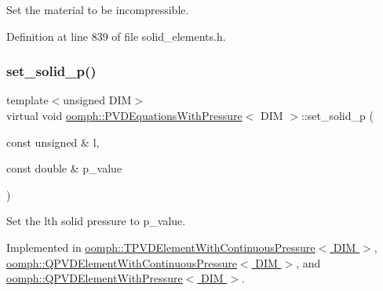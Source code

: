 Set the material to be incompressible. 



Definition at line 839 of file solid\+\_\+elements.\+h.

\mbox{\label{classoomph_1_1PVDEquationsWithPressure_a35b462a689e05929fa15a9abd2b920f0}} 
\subsubsection{\texorpdfstring{set\+\_\+solid\+\_\+p()}{set\_solid\_p()}}
{\footnotesize\ttfamily template$<$unsigned D\+IM$>$ \\
virtual void \hyperlink{classoomph_1_1PVDEquationsWithPressure}{oomph\+::\+P\+V\+D\+Equations\+With\+Pressure}$<$ D\+IM $>$\+::set\+\_\+solid\+\_\+p (\begin{DoxyParamCaption}\item[{const unsigned \&}]{l,  }\item[{const double \&}]{p\+\_\+value }\end{DoxyParamCaption})\hspace{0.3cm}{\ttfamily [pure virtual]}}



Set the lth solid pressure to p\+\_\+value. 



Implemented in \hyperlink{classoomph_1_1TPVDElementWithContinuousPressure_a3dd6618975cc1eb47cb4a4da4c3f9274}{oomph\+::\+T\+P\+V\+D\+Element\+With\+Continuous\+Pressure$<$ D\+I\+M $>$}, \hyperlink{classoomph_1_1QPVDElementWithContinuousPressure_a796553fe8e806158167c598e4c85596f}{oomph\+::\+Q\+P\+V\+D\+Element\+With\+Continuous\+Pressure$<$ D\+I\+M $>$}, and \hyperlink{classoomph_1_1QPVDElementWithPressure_a50241b9156808fb68182405335438769}{oomph\+::\+Q\+P\+V\+D\+Element\+With\+Pressure$<$ D\+I\+M $>$}.

\mbox{\label{classoomph_1_1PVDEquationsWithPressure_a2f447e84104fbdd8afe9efe52c62f2b3}} 

